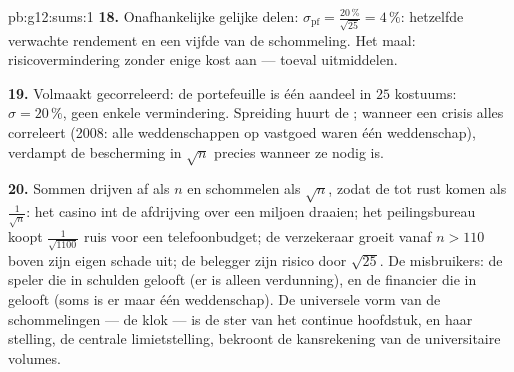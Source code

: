 \begin{solution}{pb:g12:sums:1}
\textbf{18.} Onafhankelijke gelijke delen:
$\sigma_{\text{pf}} = \frac{20\,\%}{\sqrt{25}} = 4\,\%$: hetzelfde verwachte
rendement en een vijfde van de schommeling. Het maal: risicovermindering
zonder enige kost aan  ---  toeval uitmiddelen.

\textbf{19.} Volmaakt gecorreleerd: de portefeuille is één aandeel in $25$
kostuums: $\sigma = 20\,\%$, geen enkele vermindering. Spreiding huurt de
\emph{}; wanneer een crisis alles correleert (2008: alle
weddenschappen op vastgoed waren één weddenschap), verdampt de bescherming in
$\sqrt n$ precies wanneer ze nodig is.

\textbf{20.} Sommen drijven af als $n$ en schommelen als $\sqrt n$, zodat de
 tot rust komen als $\frac{1}{\sqrt n}$: het casino int de
afdrijving over een miljoen draaien; het peilingsbureau koopt
$\frac{1}{\sqrt{1100}}$ ruis voor een telefoonbudget; de verzekeraar groeit
vanaf $n > 110$ boven zijn eigen schade uit; de belegger  zijn risico
door $\sqrt{25}$. De misbruikers: de speler die in schulden gelooft (er is
alleen verdunning), en de financier die in  gelooft (soms is
er maar één weddenschap). De universele vorm van de schommelingen --- de klok
--- is de ster van het continue hoofdstuk, en haar stelling, de centrale
limietstelling, bekroont de kansrekening van de universitaire volumes.
\end{solution}

